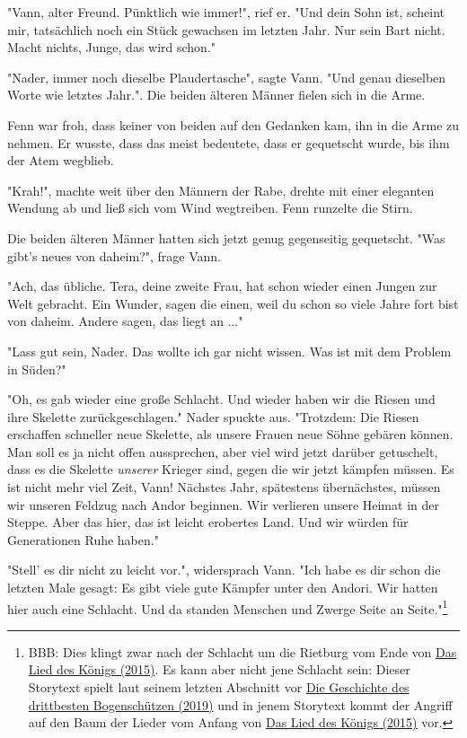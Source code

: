 \documentclass[10pt, a4paper, oneside]{book}
\newcommand{\refprodukt}[1]{\hyperref[Produkt: #1]{#1}}
\newcommand{\refstorytext}[1]{\hyperref[Storytext: #1]{#1}}
\begin{document}
\begin{multicols}{2}
"Vann, alter Freund. Pünktlich wie immer!", rief er. "Und dein Sohn ist, scheint mir, tatsächlich noch ein Stück gewachsen im letzten Jahr. Nur sein Bart nicht. Macht nichts, Junge, das wird schon."

"Nader, immer noch dieselbe Plaudertasche", sagte Vann. "Und genau dieselben Worte wie letztes Jahr.". Die beiden älteren Männer fielen sich in die Arme.

Fenn war froh, dass keiner von beiden auf den Gedanken kam, ihn in die Arme zu nehmen. Er wusste, dass das meist bedeutete, dass er gequetscht wurde, bis ihm der Atem wegblieb.

"Krah!", machte weit über den Männern der Rabe, drehte mit einer eleganten Wendung ab und ließ sich vom Wind wegtreiben. Fenn runzelte die Stirn.

Die beiden älteren Männer hatten sich jetzt genug gegenseitig gequetscht. "Was gibt's neues von daheim?", frage Vann.

"Ach, das übliche. Tera, deine zweite Frau, hat schon wieder einen Jungen zur Welt gebracht. Ein Wunder, sagen die einen, weil du schon so viele Jahre fort bist von daheim. Andere sagen, das liegt an ..."

"Lass gut sein, Nader. Das wollte ich gar nicht wissen. Was ist mit dem Problem in Süden?"

"Oh, es gab wieder eine große Schlacht. Und wieder haben wir die Riesen und ihre Skelette zurückgeschlagen." Nader spuckte aus. "Trotzdem: Die Riesen erschaffen schneller neue Skelette, als unsere Frauen neue Söhne gebären können. Man soll es ja nicht offen aussprechen, aber viel wird jetzt darüber getuschelt, dass es die Skelette \textit{unserer} Krieger sind, gegen die wir jetzt kämpfen müssen. Es ist nicht mehr viel Zeit, Vann! Nächstes Jahr, spätestens übernächstes, müssen wir unseren Feldzug nach Andor beginnen. Wir verlieren unsere Heimat in der Steppe. Aber das hier, das ist leicht erobertes Land. Und wir würden für Generationen Ruhe haben."

"Stell' es dir nicht zu leicht vor.", widersprach Vann. "Ich habe es dir schon die letzten Male gesagt: Es gibt viele gute Kämpfer unter den Andori. Wir hatten hier auch eine Schlacht. Und da standen Menschen und Zwerge Seite an Seite."\footnote{BBB: Dies klingt zwar nach der Schlacht um die Rietburg vom Ende von \refprodukt{Das Lied des Königs (2015)}. Es kann aber nicht jene Schlacht sein: Dieser Storytext spielt laut seinem letzten Abschnitt vor \refstorytext{Die Geschichte des drittbesten Bogenschützen (2019)} und in jenem Storytext kommt der Angriff auf den Baum der Lieder vom Anfang von \refprodukt{Das Lied des Königs (2015)} vor.}


\end{multicols}
\end{document}
